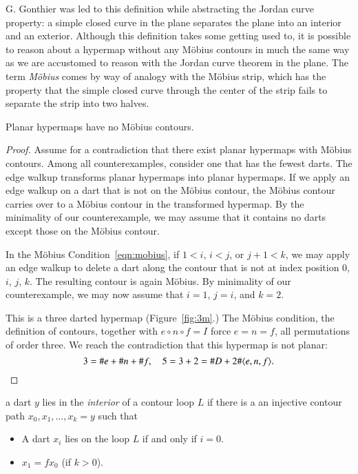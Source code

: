 \begin{remark}
 G. Gonthier was led to
this definition while abstracting the Jordan curve property: a
simple closed curve in the plane separates the plane into an
interior and an exterior.  Although this definition takes some getting used to,
it is possible to reason about a hypermap without any M\"obius contours in
much the same way as we are accustomed to reason with the Jordan curve theorem
in the plane.
The term {\it M\"obius} comes by way of
analogy with the M\"obius strip, which has the property that the
simple closed curve through the center of the strip fails to
separate the strip into two halves.
\end{remark}



\begin{lemma}\label{lemma:no-mobius}  
Planar hypermaps have no M\"obius contours.
\end{lemma}

\begin{proof} Assume for a contradiction that there exist planar
hypermaps with M\"obius contours.  Among all counterexamples,
consider one that has the fewest darts.  The edge walkup transforms
planar hypermaps into planar hypermaps.  If we apply an edge walkup
 on a dart that is not on the M\"obius contour, the
M\"obius contour carries over to a M\"obius contour 
in the transformed hypermap.  By the
minimality of our counterexample, we may assume that it contains no
darts except those on the M\"obius contour.

In the M\"obius Condition~\ref{eqn:mobius}, if $1<i$, $i<j$, or
$j+1<k$, we may apply an edge walkup to  delete a
dart along the contour that is not at index position $0$, $i$,
$j$, $k$.  The resulting contour is again M\"obius.
By minimality of our counterexample, we may now assume
that $i=1$, $j=i$, and $k=2$.

This is a three darted hypermap (Figure~\ref{fig:3m}.)  
The M\"obius condition, the
definition of contours, together with $e\circ n\circ f=I$ force
$e=n=f$, all permutations of order three. We reach the contradiction
that this hypermap is not planar:
    $$3 = \# e + \# n + \# f,\quad 5 = 3+2 = \# D + 2 \#\langle e,n,f\rangle.$$
\end{proof}

\begin{definition}\label{def:interior} 
a dart $y$ lies in the {\it interior} of a contour
loop $L$ if there is a an injective contour path
$x_0,x_1,\ldots,x_k=y$ such that 
\begin{itemize}
 \item A dart $x_i$ lies on the loop $L$ if and only if $i=0$.
 \item $x_1 = f x_0$ (if $k>0$).
\end{itemize}
\end{definition}


